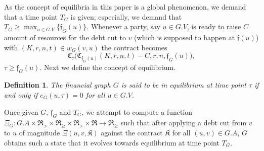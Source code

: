 \documentclass[10pt]{article}
\newcommand{\RR}{\mathfrak{R}}
\newcommand{\KK}{\mathfrak{K}}
\newcommand{\ff}{\mathfrak{f}}
\newtheorem{mydef}{Definition}
\begin{document}
As the concept of equilibria in this paper is a global phenomenon, we demand that a time point $T_G$ is given; especially, we demand that $T_G \geq \max_{u \in G.V} \{ \mathfrak{f}_G(u) \}$. Whenever a party, say $u \in G.V$, is ready to raise $C$ amount of resources for the debt cut to $v$ (which is supposed to happen at $\mathfrak{f}(u)$) with $(K, r, n, t) \in w_G(v, u)$ the contract becomes 
\[
\mathfrak{C}_{\tau}\big(\mathfrak{C}_{\mathfrak{f}_G(u)}(K, r, n, t) - C, r, n, \mathfrak{f}_G(u) \big),
\]
$\tau \geq \mathfrak{f}_G(u)$.
 Next we define the concept of equilibrium.
\begin{mydef}
The financial graph $G$ is said to be in equilibrium at time point $\tau$ if and only if $e_G(u,\tau) = 0$ for all $u \in G.V$.
\end{mydef}
Once given $G$, $\ff_G$ and $T_G$, we attempt to compute a function $\Xi_G \colon G.A \times \RR_> \times \RR_{\geq} \times \RR_> \times \RR \to \RR_{\geq}$ such that after applying a debt cut from $v$ to $u$ of magnitude $\Xi(u, v, \KK)$ against the contract $\KK$ for  all $(u, v) \in G.A$, $G$ obtains such a state that it evolves towards equilibrium at time point $T_G$.
\end{document}
